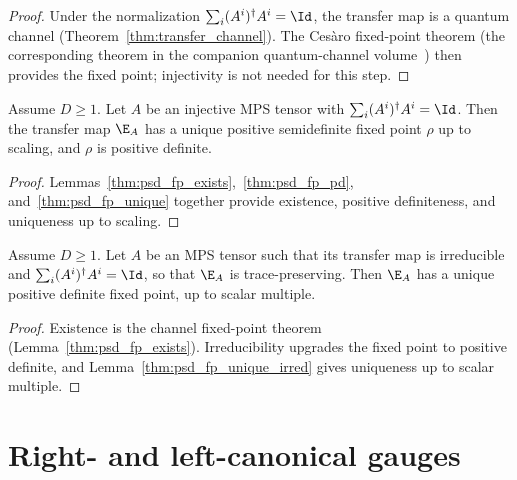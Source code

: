 \begin{proof}
    \leanok
    Under the normalization $\sum_i (A^i)^\dagger A^i = \Id$,
    the transfer map is a quantum channel
    (Theorem~\ref{thm:transfer_channel}).
    The Ces\`aro fixed-point theorem
    (the corresponding theorem in the companion quantum-channel volume~\cite[``Ces\`aro fixed-point theorem'']{QICLean2026Blueprint}) then provides the
    fixed point; injectivity is not needed for this step.
\end{proof}

\begin{theorem}\label{thm:qpf}
    \leanok
    Assume $D \ge 1$. Let $A$ be an injective MPS tensor with
    $\sum_i (A^i)^\dagger A^i = \Id$.
    Then the transfer map $\E_A$ has a unique positive semidefinite fixed point
    $\rho$ up to scaling, and $\rho$ is positive definite.
\end{theorem}

\begin{proof}
    \leanok
    Lemmas~\ref{thm:psd_fp_exists},~\ref{thm:psd_fp_pd},
    and~\ref{thm:psd_fp_unique} together provide existence, positive
    definiteness, and uniqueness up to scaling.
\end{proof}

\begin{theorem}
    \label{thm:qpf_irreducible}
    \leanok
    Assume $D\ge 1$. Let $A$ be an MPS tensor such that its transfer map is
    irreducible and $\sum_i (A^i)^\dagger A^i=\Id$, so that $\E_A$ is
    trace-preserving.
    Then $\E_A$ has a unique positive definite fixed point, up to scalar
    multiple.
\end{theorem}

\begin{proof}\leanok
    Existence is the channel fixed-point theorem
    (Lemma~\ref{thm:psd_fp_exists}). Irreducibility upgrades the fixed point
    to positive definite, and Lemma~\ref{thm:psd_fp_unique_irred} gives
    uniqueness up to scalar multiple.
\end{proof}

\section{Right- and left-canonical gauges}


